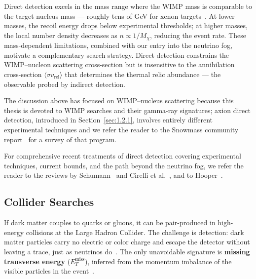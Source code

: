 Direct detection excels in the mass range where the WIMP mass is comparable to the target nucleus mass --- roughly tens of GeV for xenon targets~\cite{Cirelli:2024ssz}.
At lower masses, the recoil energy drops below experimental thresholds; at higher masses, the local number density decreases as $n \propto 1/M_\chi$, reducing the event rate.
These mass-dependent limitations, combined with our entry into the neutrino fog, motivate a complementary search strategy.
Direct detection constrains the WIMP--nucleon scattering cross-section but is insensitive to the annihilation cross-section $\langle \sigma v_\mathrm{rel} \rangle$ that determines the thermal relic abundance --- the observable probed by indirect detection.

The discussion above has focused on WIMP--nucleus scattering because this thesis is devoted to WIMP searches and their gamma-ray signatures; axion direct detection, introduced in Section~\ref{sec:1.2.1}, involves entirely different experimental techniques and we refer the reader to the Snowmass community report~\cite{Adams:2022pbo} for a survey of that program.

For comprehensive recent treatments of direct detection covering experimental techniques, current bounds, and the path beyond the neutrino fog, we refer the reader to the reviews by Schumann~\cite{Schumann:2019eaa} and Cirelli et al.~\cite{Cirelli:2024ssz}, and to Hooper~\cite{Hooper:2024}.

\subsection{Collider Searches}
\label{sec:1.3.2}

If dark matter couples to quarks or gluons, it can be pair-produced in high-energy collisions at the Large Hadron Collider.
The challenge is detection: dark matter particles carry no electric or color charge and escape the detector without leaving a trace, just as neutrinos do~\cite{Cirelli:2024ssz,Hooper:2024}.
The only unavoidable signature is \textbf{missing transverse energy} ($E_T^\text{miss}$), inferred from the momentum imbalance of the visible particles in the event~\cite{Cirelli:2024ssz}.

